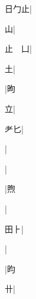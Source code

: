 \begin{multicols}{2}
{{\cjk{}日勹止}|{}\par
{山}|{}\par
{\cjk{}止{\cnsym{}　}凵}|{}\par
{\cjk{}{\cnsym{}　}{\cnsym{}　}土}|{}\par
{\cjk{}{\cnsym{}　}{\cnsym{}　}{\cnsym{}　}}|{\cjk{}昫}\par
{\cjk{}{\cnsym{}　}{\cnsym{}　}立}|{}\par
{\cjk{}{\cnsym{}　}耂匕}|{}\par
{\cjk{}{\cnsym{}　}{\cnsym{}　}{\cnsym{}　}}|{}\par
{\cjk{}{\cnsym{}　}{\cnsym{}　}{\cnsym{}　}}|{}\par
{\cjk{}{\cnsym{}　}{\cnsym{}　}{\cnsym{}　}}|{\cjk{}煦}\par
{\cjk{}{\cnsym{}　}{\cnsym{}　}{\cnsym{}　}}|{}\par
{\cjk{}{\cnsym{}　}田{\cnrtwo{}⺊}}|{}\par
{\cjk{}{\cnsym{}　}{\cnsym{}　}{\cnsym{}　}}|{}\par
{\cjk{}{\cnsym{}　}{\cnsym{}　}{\cnsym{}　}}|{\cjk{}昀}\par
{\cjk{}{\cnsym{}　}{\cnsym{}　}卄}|{}\par
}
\end{multicols}
